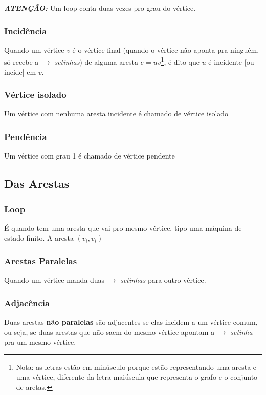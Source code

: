 \documentclass[12pt]{article}
\begin{document}
\textbf{\textit{ATENÇÃO:}} Um loop conta duas vezes pro grau do vértice.

\subsubsection{Incidência}
Quando um vértice $v$ é o vértice final (quando o vértice não aponta pra ninguém, só recebe a $\longrightarrow$ \textit{setinhas}) de alguma aresta $e = uv$\footnote{
	Nota: as letras estão em minúsculo porque estão representando uma aresta e uma vértice, diferente da letra maiúscula que representa o grafo e o conjunto de aretas.
}, é dito que $u$ é incidente [ou incide] em $v$.

\subsubsection{Vértice isolado}
Um vértice com nenhuma aresta incidente é chamado de vértice isolado

\subsubsection{Pendência}
Um vértice com grau 1 é chamado de vértice pendente

\subsection{Das Arestas}

\subsubsection{Loop}
É quando tem uma aresta que vai pro mesmo vértice, tipo uma máquina de estado finito.
A aresta $(v_i, v_i)$

\subsubsection{Arestas Paralelas}
Quando um vértice manda duas $\longrightarrow$ \textit{setinhas} para outro vértice.

\subsubsection{Adjacência}
Duas arestas \textbf{não paralelas} são adjacentes se elas incidem a um vértice comum, ou seja, se duas arestas que não saem do mesmo vértice apontam a $\longrightarrow$ \textit{setinha} pra um mesmo vértice.
\end{document}
